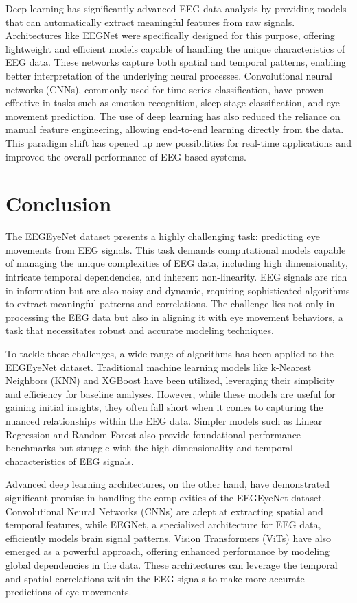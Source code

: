 \documentclass{article}
\begin{document}
Deep learning has significantly advanced EEG data analysis by providing models that can automatically extract meaningful features from raw signals. Architectures like EEGNet were specifically designed for this purpose, offering lightweight and efficient models capable of handling the unique characteristics of EEG data. These networks capture both spatial and temporal patterns, enabling better interpretation of the underlying neural processes. Convolutional neural networks (CNNs), commonly used for time-series classification, have proven effective in tasks such as emotion recognition, sleep stage classification, and eye movement prediction. The use of deep learning has also reduced the reliance on manual feature engineering, allowing end-to-end learning directly from the data. This paradigm shift has opened up new possibilities for real-time applications and improved the overall performance of EEG-based systems.



\section{Conclusion}

The EEGEyeNet dataset presents a highly challenging task: predicting eye movements from EEG signals. This task demands computational models capable of managing the unique complexities of EEG data, including high dimensionality, intricate temporal dependencies, and inherent non-linearity. EEG signals are rich in information but are also noisy and dynamic, requiring sophisticated algorithms to extract meaningful patterns and correlations. The challenge lies not only in processing the EEG data but also in aligning it with eye movement behaviors, a task that necessitates robust and accurate modeling techniques.

To tackle these challenges, a wide range of algorithms has been applied to the EEGEyeNet dataset. Traditional machine learning models like k-Nearest Neighbors (KNN) and XGBoost have been utilized, leveraging their simplicity and efficiency for baseline analyses. However, while these models are useful for gaining initial insights, they often fall short when it comes to capturing the nuanced relationships within the EEG data. Simpler models such as Linear Regression and Random Forest also provide foundational performance benchmarks but struggle with the high dimensionality and temporal characteristics of EEG signals.

Advanced deep learning architectures, on the other hand, have demonstrated significant promise in handling the complexities of the EEGEyeNet dataset. Convolutional Neural Networks (CNNs) are adept at extracting spatial and temporal features, while EEGNet, a specialized architecture for EEG data, efficiently models brain signal patterns. Vision Transformers (ViTs) have also emerged as a powerful approach, offering enhanced performance by modeling global dependencies in the data. These architectures can leverage the temporal and spatial correlations within the EEG signals to make more accurate predictions of eye movements.
\end{document}
